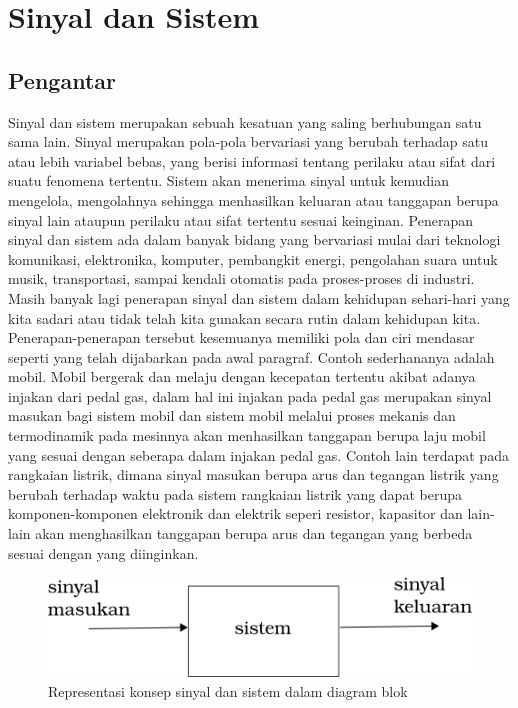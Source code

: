 \chapter{Sinyal dan Sistem}

\section{Pengantar}
Sinyal dan sistem merupakan sebuah kesatuan yang saling berhubungan satu sama lain. Sinyal merupakan pola-pola bervariasi yang berubah terhadap satu atau lebih variabel bebas, yang berisi informasi tentang perilaku atau sifat dari suatu fenomena tertentu. Sistem akan menerima sinyal untuk kemudian mengelola, mengolahnya sehingga menhasilkan keluaran atau tanggapan berupa sinyal lain ataupun perilaku atau sifat tertentu sesuai keinginan. Penerapan sinyal dan sistem ada dalam banyak bidang yang bervariasi mulai dari teknologi komunikasi, elektronika, komputer, pembangkit energi, pengolahan suara untuk musik, transportasi, sampai kendali otomatis pada proses-proses di industri. Masih banyak lagi penerapan sinyal dan sistem dalam kehidupan sehari-hari yang kita sadari atau tidak telah kita gunakan secara rutin dalam kehidupan kita. Penerapan-penerapan tersebut kesemuanya memiliki pola dan ciri mendasar seperti yang telah dijabarkan pada awal paragraf. Contoh sederhananya adalah mobil. Mobil bergerak dan melaju dengan kecepatan tertentu akibat adanya injakan dari pedal gas, dalam hal ini injakan pada pedal gas merupakan sinyal masukan bagi sistem mobil dan sistem mobil melalui proses mekanis dan termodinamik pada mesinnya akan menhasilkan tanggapan berupa laju mobil yang sesuai dengan seberapa dalam injakan pedal gas. Contoh lain terdapat pada rangkaian listrik, dimana sinyal masukan berupa arus dan tegangan listrik yang berubah terhadap waktu pada sistem rangkaian listrik yang dapat berupa komponen-komponen elektronik dan elektrik seperi resistor, kapasitor dan lain-lain akan menghasilkan tanggapan berupa arus dan tegangan yang berbeda sesuai dengan yang diinginkan. 

\begin{figure}[!h]
\centering
\includegraphics[scale=0.7]{pict/sinyalsistem}
\caption{Representasi konsep sinyal dan sistem dalam diagram blok}\label{sinyalsistem}
\end{figure}


